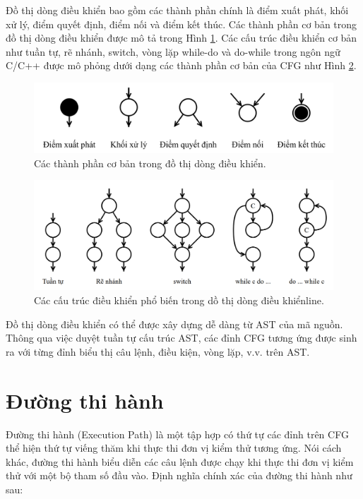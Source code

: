 Đồ thị dòng điều khiển bao gồm các thành phần chính là điểm xuất phát, khối xử lý, điểm quyết định, điểm nối và điểm kết thúc. Các thành phần cơ bản trong đồ thị dòng điều khiển được mô tả trong Hình \ref{fig:flow-element}. Các cấu trúc điều khiển cơ bản như tuần tự, rẽ nhánh, switch, vòng lặp while-do và do-while trong ngôn ngữ C/C++ được mô phỏng dưới dạng các thành phần cơ bản của CFG như Hình \ref{fig:flow-structure}.
\begin{figure}[h]
	\centering
	\includegraphics[width=\linewidth]{images/flow-element.png}
	\caption{Các thành phần cơ bản trong đồ thị dòng điều khiển.}
	\label{fig:flow-element}
\end{figure}
\begin{figure}
	\centering
	\includegraphics[width=\linewidth]{images/flow-structure.png}
	\caption{Các cấu trúc điều khiển phổ biến trong dồ thị dòng điều khiểnline.}
	\label{fig:flow-structure}
\end{figure}

Đồ thị dòng điều khiển có thể được xây dựng dễ dàng từ AST của mã nguồn. Thông qua việc duyệt tuần tự cấu trúc AST, các đỉnh CFG tương ứng được sinh ra với từng đỉnh biểu thị câu lệnh, điều kiện, vòng lặp, v.v. trên AST.

\section{Đường thi hành}\label{sec:path}
Đường thi hành (Execution Path) là một tập hợp có thứ tự các đỉnh trên CFG thể hiện thứ tự viếng thăm khi thực thi đơn vị kiểm thử tương ứng. Nói cách khác, đường thi hành biểu diễn các câu lệnh được chạy khi thực thi đơn vị kiểm thử với một bộ tham số đầu vào. Định nghĩa chính xác của đường thi hành như sau:

